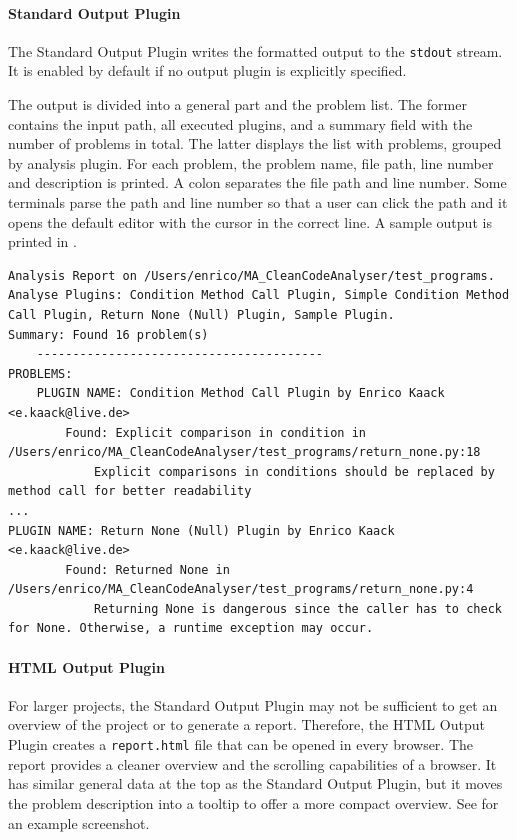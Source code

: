 \paragraph{Standard Output Plugin}
The Standard Output Plugin writes the formatted output to the \texttt{stdout} stream. It is enabled by default if no output plugin is explicitly specified. 

The output is divided into a general part and the problem list. The former contains the input path, all executed plugins, and a summary field with the number of problems in total. The latter displays the list with problems, grouped by analysis plugin.  
For each problem, the problem name, file path, line number and description is printed. A colon separates the file path and line number. Some terminals parse the path and line number so that a user can click the path and it opens the default editor with the cursor in the correct line. A sample output is printed in .

\begin{lstlisting}[float, floatplacement=h, label=lst:stdout, caption={Example output to \texttt{stdout} of the Standard Output Plugin. Besides a list of problems, it also outputs additional }]
Analysis Report on /Users/enrico/MA_CleanCodeAnalyser/test_programs.
Analyse Plugins: Condition Method Call Plugin, Simple Condition Method Call Plugin, Return None (Null) Plugin, Sample Plugin.
Summary: Found 16 problem(s)
    ----------------------------------------
PROBLEMS:
    PLUGIN NAME: Condition Method Call Plugin by Enrico Kaack <e.kaack@live.de>
        Found: Explicit comparison in condition in /Users/enrico/MA_CleanCodeAnalyser/test_programs/return_none.py:18
            Explicit comparisons in conditions should be replaced by method call for better readability
...
PLUGIN NAME: Return None (Null) Plugin by Enrico Kaack <e.kaack@live.de>
        Found: Returned None in /Users/enrico/MA_CleanCodeAnalyser/test_programs/return_none.py:4
            Returning None is dangerous since the caller has to check for None. Otherwise, a runtime exception may occur.
\end{lstlisting} 

\paragraph{HTML Output Plugin}
For larger projects, the Standard Output Plugin may not be sufficient to get an overview of the project or to generate a report. Therefore, the HTML Output Plugin creates a \texttt{report.html} file that can be opened in every browser. The report provides a cleaner overview and the scrolling capabilities of a browser. It has similar general data at the top as the Standard Output Plugin, but it moves the problem description into a tooltip to offer a more compact overview. See  for an example screenshot.

